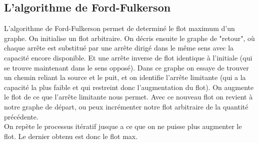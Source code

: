 \subsection{L'algorithme de Ford-Fulkerson}
\begin{myalgo}
  L'algorithme de Ford-Fulkerson permet de determiné le flot maximum d'un graphe.
  On initialise un flot arbitraire.
  On décris ensuite le graphe de "retour", où chaque arrête est substitué par une arrête dirigé dans le même sens avec la 
  capacité encore disponible. Et une arrête inverse de flot identique à l'initiale (qui se trouve maintenant dans le sens opposé).
  Dans ce graphe on essaye de trouver un chemin reliant la source et le puit, et on identifie l'arrête limitante (qui a la capacité la plus faible
  et qui restreint donc l'augmentation du flot). On augmente le flot de ce que l'arrête limitante nous permet.
  Avec ce nouveau flot on revient à notre graphe de départ, ou peux incrémenter notre flot arbitraire de la quantité précédente.\\
  On repète le processus itératif jusque a ce que on ne puisse plus augmenter le flot. Le dernier obtenu est donc le flot max.
\end{myalgo}


